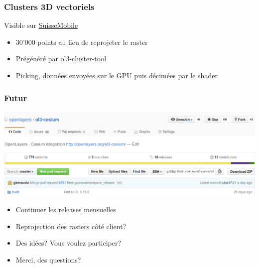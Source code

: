 \documentclass{beamer}
\begin{document}
  \begin{frame}
    \frametitle{Clusters 3D vectoriels}
    Visible sur \href{https://map.schweizmobil.ch/?cesium&trackId=2149217&layers=Train}{SuisseMobile}
    \begin{itemize}
      \item 30'000 points au lieu de reprojeter le raster
      \item Prégénéré par \href{https://github.com/gberaudo/ol3-cluster-tool}{ol3-cluster-tool}
      \item Picking, données envoyées sur le GPU puis décimées par le shader
    \end{itemize}
  \end{frame}

  \begin{frame}
    \frametitle{Futur}
    \vspace{-20pt}\begin{center}
      \includegraphics[width=0.9\linewidth]{./github2.png}
    \end{center}
    \begin{itemize}
      \item Continuer les releases mensuelles
        \pause
      \item Reprojection des rasters côté client?
        \pause
      \item Des idées? Vous voulez participer?
        \pause
      \item Merci, des questions?
    \end{itemize}
  \end{frame}
\end{document}
